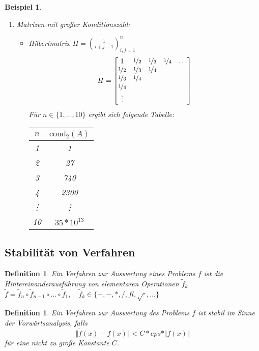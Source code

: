 \documentclass[12pt]{article}
\theoremstyle{break}
\newtheorem{definition}[theorem]{Definition}
\newtheorem{example}[theorem]{Beispiel}
\begin{document}
\begin{example}
\begin{enumerate}
  \item Matrizen mit großer Konditionszahl: 
    \begin{itemize}
      \item Hilbertmatrix $H = \left(\frac{1}{i+j-1}\right)_{i,j=1}^n$
        $$ H = \left[ \begin{matrix}1 & \nicefrac{1}{2} & \nicefrac{1}{3} & \nicefrac{1}{4} & \dots \\ \nicefrac{1}{2} & \nicefrac{1}{3} & \nicefrac{1}{4} \\ \nicefrac{1}{3} & \nicefrac{1}{4} \\ \nicefrac{1}{4} \\ \vdots \end{matrix} \right]$$
        Für $n \in \{1,..., 10\}$ ergibt sich folgende Tabelle:\\
        \begin{tabular}{c|c}
        $n$ & $\text{cond}_2(A)$ \\
        \hline
        1 & 1 \\
        2 & 27 \\
        3 & 740 \\
        4 & 2300 \\
        \vdots & \vdots \\
        10 & $35 * 10^{13}$
        \end{tabular}
    \end{itemize}
\end{enumerate}
\end{example}

\subsection{Stabilität von Verfahren}
\begin{definition}
Ein Verfahren zur Auswertung eines Problems $f$ ist die Hintereinanderausführung von elementaren Operationen $\tilde{f}_k$ \\
$\tilde{f} = \tilde{f}_n \circ \tilde{f}_{n-1} \circ ... \circ \tilde{f}_1, \quad \tilde{f}_k \in \{ +, -, *, /, fl, \sqrt{\cdot}, ...\} $
\end{definition}

\begin{definition}
Ein Verfahren zur Auswertung des Problems $f$ ist stabil im Sinne der Vorwärtsanalysis, falls 
$$\Vert \tilde{f}(x) - f(x) \Vert < C * eps *  \Vert f(x) \Vert$$
für eine nicht zu große Konstante $C$.
\end{definition}
\end{document}
